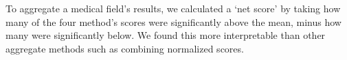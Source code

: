 \documentclass[11pt,a4paper]{article}
\begin{document}
To aggregate a medical field's results, we calculated a `net score' by taking how many of the four method's scores were significantly above the mean, minus how many were significantly below. We found this more interpretable than other aggregate methods such as combining normalized scores. 

%
%
%
%
%
%
%
\end{document}
